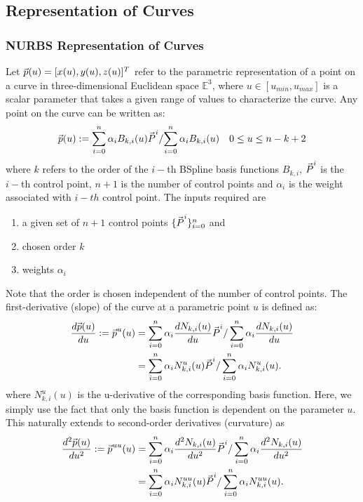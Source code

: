 \documentclass[submit,12pt]{aiaa-pretty} %
\newcommand{\td}[2]{\dfrac{d #1}{d #2}}
\newcommand{\tdt}[2]{\dfrac{d^2 #1}{d #2^2}}
\newcommand*{\vv}[1]{\vec{\mkern0mu#1}}
\begin{document}
\subsection{Representation of Curves}
\subsubsection{NURBS Representation of Curves}
Let $\vv{p}(u) = [x(u), y(u), z(u)]^T$ refer to the parametric
representation of a point on a curve in three-dimensional Euclidean
space $\mathbb{E}^3$, where $u \in [u_{min}, u_{max}]$ is a scalar
parameter that takes a given range of values to characterize the curve. 
Any point on the curve can be written as:
\begin{equation}
  \vv{p}(u) := {\sum_{i=0}^n \alpha_i B_{k,i}(u) \vv{P}^{i}}/{\sum_{i=0}^n \alpha_i B_{k,i}(u)} \quad 0 \le u \le n-k+2
\end{equation}
where $k$ refers to the order of the $i-$th BSpline basis functions $B_{k,i}$, 
$\vv{P}^i$ is the $i-$th control point,  $n+1$ is the number of control points
and $\alpha_i$ is the weight associated with $i-th$ control point. 
The inputs required  are 
\begin{enumerate}
\item a given set of $n+1$ control points $\{\vv{P}^i\}_{i=0}^n$ and 
\item chosen order $k$
\item weights $\alpha_i$
\end{enumerate}
Note that the order is chosen independent of the number of control
points. The first-derivative (slope) of the curve at a parametric point $u$ is defined as:
\begin{equation}
  \begin{aligned}
    \td{\vv{p}(u)}{u} := \vv{p}^u(u) & = \sum_{i=0}^n  \alpha_i \td{N_{k,i}(u)}{u} \vv{P}^{i} / \sum_{i=0}^n \alpha_i \td{N_{k,i}(u)}{u}  \\ &= \sum_{i=0}^n \alpha_i N_{k,i}^{u}(u) \vv{P}^{i} /\sum_{i=0}^n \alpha_i N_{k,i}^{u}(u).
  \end{aligned}
\end{equation}
where $N_{k,i}^u(u)$ is the u-derivative of the corresponding basis
function. Here, we simply use the fact that only the basis function is
dependent on the parameter $u$. This naturally extends to second-order
derivatives (curvature) as
\begin{equation}
  \begin{aligned}
    \tdt{\vv{p}(u)}{u} := \vv{p}^{uu}(u) & = \sum_{i=0}^n \alpha_i \tdt{N_{k,i}(u)}{u} \vv{P}^{i}/\sum_{i=0}^n \alpha_i \tdt{N_{k,i}(u)}{u} \\ & = \sum_{i=0}^n \alpha_i N_{k,i}^{uu}(u) \vv{P}^{i}/\sum_{i=0}^n \alpha_i N_{k,i}^{uu}(u).
  \end{aligned}
\end{equation}
\end{document}
